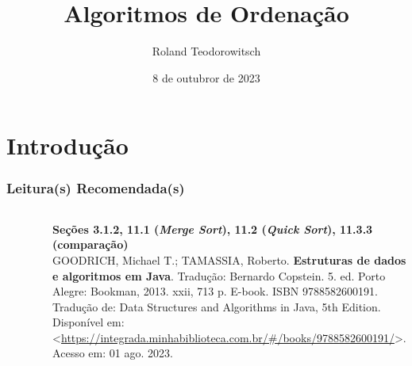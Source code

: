 \documentclass[aspectratio=169]{beamer}
\title[\sc{Algoritmos de Ordenação}]{Algoritmos de Ordenação}
\author[Roland Teodorowitsch]{Roland Teodorowitsch}
\institute[ALEST I - EP - PUCRS]{Algoritmos e Estruturas de Dados I - Escola Politécnica - PUCRS}
\date{8 de outubror de 2023}
\begin{document}
\justifying

\begin{frame}
	\titlepage
\end{frame}

\section{Introdução}

\begin{frame}\frametitle{Leitura(s) Recomendada(s)}

\begin{columns}[T]
\begin{column}{0.15\linewidth}
\vspace{-3mm}
\begin{figure}[h]
	\centering
	\includegraphics[height=0.3\paperheight]{imagens/livro_goodrich.jpg}
\end{figure}
\end{column}
\begin{column}{0.85\linewidth}
\vspace{3mm}
\textbf{Seções 3.1.2, 11.1 (\emph{Merge Sort}), 11.2 (\emph{Quick Sort}), 11.3.3 (comparação)}\\
\scriptsize{GOODRICH, Michael T.; TAMASSIA, Roberto. \textbf{Estruturas de dados e algoritmos em Java}. Tradução: Bernardo Copstein. 5. ed. Porto Alegre: Bookman, 2013. xxii, 713 p. E-book. ISBN 9788582600191. Tradução de: Data Structures and Algorithms in Java, 5th Edition. Disponível em: \textless{}\url{https://integrada.minhabiblioteca.com.br/\#/books/9788582600191/}\textgreater{}. Acesso em: 01 ago. 2023.}
\end{column}
\end{columns}

\end{frame}
\end{document}
